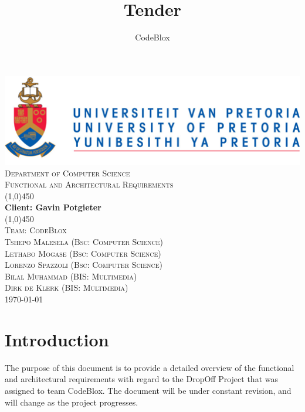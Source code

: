 \documentclass[a4paper,12pt]{article}
\author{CodeBlox}
\title{Tender}
\begin{document}
	\setlength{\parskip}{6pt}
	
	\begin{titlepage}
		\begin{center}
			\includegraphics[width=1\textwidth]{./Pictures/up_logo.png}\\[1.5cm] 
			\textsc{\LARGE Department of Computer Science} \\ [.5cm]
			\textsc{\Large Functional and Architectural Requirements} \\ [.5cm]
			\line(1,0){450}\\[.5cm]
			\huge{\bfseries Client: Gavin Potgieter}\\
			\line(1,0){450}\\[.5cm]
			\textsc{\LARGE Team: CodeBlox}\\ [0.5cm]
			
			
			\textsc{\large Tshepo Malesela (Bsc: Computer Science)}\\
			\textsc{\large Lethabo Mogase (Bsc: Computer Science)}\\
			\textsc{\large Lorenzo Spazzoli (Bsc: Computer Science)}\\
			\textsc{\large Bilal Muhammad (BIS: Multimedia)}\\
			\textsc{\large Dirk de Klerk (BIS: Multimedia)}\\ [3.9cm]
			
			\large\today
		\end{center}
	\end{titlepage}
	
	\tableofcontents
	\thispagestyle{empty}
	\footnotesize
	\normalsize
	
	
	
	
	\newpage
	\section{Introduction}
	The purpose of this document is to provide a detailed overview of the functional and architectural requirements with regard to the DropOff Project that was assigned to team CodeBlox. The document will be under constant revision, and will change as the project progresses. 
	
\end{document}
